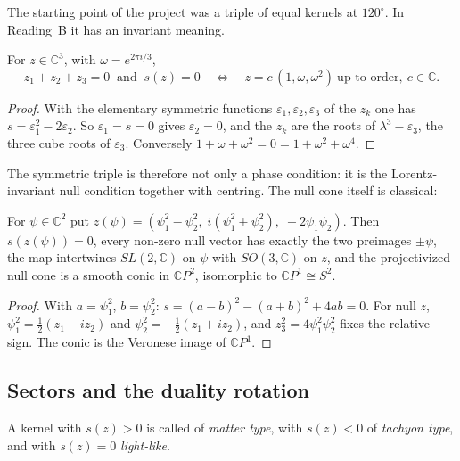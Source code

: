 The starting point of the project was a triple of equal kernels at \(120^\circ\).  In Reading~B it has an invariant meaning.

\begin{lemma}\label{lem:triple}
For \(z\in\mathbb C^3\), with \(\omega=e^{2\pi i/3}\),
\[
z_1+z_2+z_3=0\ \text{ and }\ s(z)=0
\quad\Longleftrightarrow\quad
z=c\,(1,\omega,\omega^2)\ \text{up to order},\ c\in\mathbb C .
\]
\end{lemma}

\begin{proof}
With the elementary symmetric functions \(\varepsilon_1,\varepsilon_2,\varepsilon_3\) of the \(z_k\) one has
\(s=\varepsilon_1^2-2\varepsilon_2\).  So \(\varepsilon_1=s=0\) gives \(\varepsilon_2=0\), and the \(z_k\) are the roots of
\(\lambda^3-\varepsilon_3\), the three cube roots of \(\varepsilon_3\).  Conversely \(1+\omega+\omega^2=0=1+\omega^2+\omega^4\).
\end{proof}

The symmetric triple is therefore not only a phase condition: it is the Lorentz-invariant null condition together with
centring.  The null cone itself is classical:

\begin{proposition}\label{prop:nullcone}
For \(\psi\in\mathbb C^2\) put \(z(\psi)=(\psi_1^2-\psi_2^2,\;i(\psi_1^2+\psi_2^2),\;-2\psi_1\psi_2)\).  Then \(s(z(\psi))=0\),
every non-zero null vector has exactly the two preimages \(\pm\psi\), the map intertwines \(SL(2,\mathbb C)\) on \(\psi\) with
\(SO(3,\mathbb C)\) on \(z\), and the projectivized null cone is a smooth conic in \(\mathbb CP^2\), isomorphic to
\(\mathbb CP^1\cong S^2\).
\end{proposition}

\begin{proof}
With \(a=\psi_1^2\), \(b=\psi_2^2\): \(s=(a-b)^2-(a+b)^2+4ab=0\).  For null \(z\), \(\psi_1^2=\tfrac12(z_1-iz_2)\) and
\(\psi_2^2=-\tfrac12(z_1+iz_2)\), and \(z_3^2=4\psi_1^2\psi_2^2\) fixes the relative sign.  The conic is the Veronese image of
\(\mathbb CP^1\).
\end{proof}

\subsection{Sectors and the duality rotation}

\begin{definition}\label{def:sectors}
A kernel with \(s(z)>0\) is called of \emph{matter type}, with \(s(z)<0\) of \emph{tachyon type}, and with \(s(z)=0\)
\emph{light-like}.
\end{definition}

